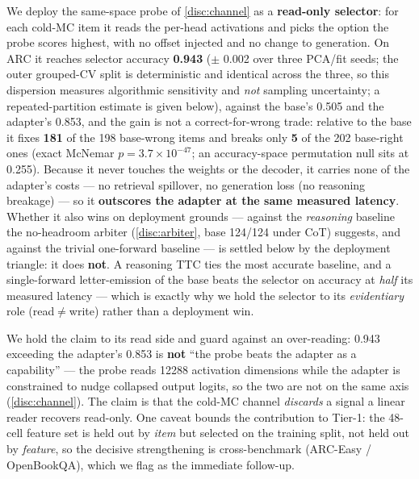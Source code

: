 We deploy the same-space probe of \cref{disc:channel} as a \textbf{read-only
selector}: for each cold-MC item it reads the per-head activations and picks the
option the probe scores highest, with no offset injected and no change to
generation. On ARC it reaches selector accuracy \textbf{0.943} ($\pm$ 0.002 over
three PCA/fit seeds; the outer grouped-CV split is deterministic and identical across
the three, so this dispersion measures algorithmic sensitivity and \emph{not}
sampling uncertainty; a repeated-partition estimate is given below),
against the base's 0.505 and the adapter's 0.853, and the gain is not
a correct-for-wrong trade: relative to the base it fixes \textbf{181} of the 198
base-wrong items and breaks only \textbf{5} of the 202 base-right ones (exact
McNemar $p = 3.7\times10^{-47}$; an accuracy-space permutation null sits at 0.255).
Because it never touches the weights or the decoder, it carries none of the
adapter's costs --- no retrieval spillover, no generation loss (no reasoning
breakage) --- so it \textbf{outscores the adapter at the same measured latency}.
Whether it also wins on deployment grounds --- against the
\emph{reasoning} baseline the no-headroom arbiter (\cref{disc:arbiter}, base
124/124 under CoT) suggests, and against the trivial one-forward baseline --- is
settled below by the deployment triangle: it does \textbf{not}. A
reasoning TTC ties the most accurate baseline, and a single-forward letter-emission
of the base beats the selector on accuracy at \emph{half} its measured latency ---
which is exactly why we hold the selector to its \emph{evidentiary} role
(read${\neq}$write) rather than a deployment win.

We hold the claim to its read side and guard against an over-reading: 0.943
exceeding the adapter's 0.853 is \textbf{not} ``the probe beats the adapter as a
capability'' --- the probe reads 12288 activation dimensions while the adapter is
constrained to nudge collapsed output logits, so the two are not on the same axis
(\cref{disc:channel}). The claim is that the cold-MC channel \emph{discards} a
signal a linear reader recovers read-only. One caveat bounds the contribution to
Tier-1: the 48-cell feature set is held out by \emph{item} but selected on the
training split, not held out by \emph{feature}, so the decisive strengthening is
cross-benchmark (ARC-Easy / OpenBookQA), which we flag as the immediate follow-up.

